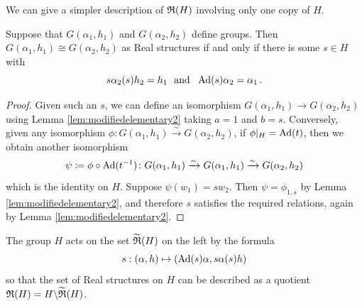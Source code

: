 We can give a simpler description of ${\mathfrak R}(H)$ involving only one copy of $H$.

\begin{lemma}\label{lem:elementary3}
  Suppose that $G(\alpha_1, h_1)$ and $G(\alpha_2, h_2)$ define groups. Then $G(\alpha_1, h_1) \cong G(\alpha_2, h_2)$ as Real structures if and only if there is some $s \in H$ with
  \begin{equation}\label{copyH2action2}
  s  \alpha_2(s) h_2  = h_1
  \ \mbox{ and } \ 
    \Ad(s) \alpha_2 = \alpha_1 \, .
\end{equation} 
\end{lemma}
\begin{proof}
  Given such an $s$, we can define an isomorphism $G(\alpha_1, h_1) \rightarrow G(\alpha_2, h_2)$ using Lemma \ref{lem:modifiedelementary2} taking $a = 1$ and $b = s$. Conversely, given any isomorphism $\phi \colon G(\alpha_1, h_1) \xrightarrow{\sim} G(\alpha_2, h_2)$, if $\phi|_H = \operatorname{Ad}(t)$, then we obtain another isomorphism
  \[
  \psi \coloneqq \phi \circ \operatorname{Ad}(t^{-1}) \colon G(\alpha_1, h_1) \xrightarrow{\sim} G(\alpha_1, h_1) \xrightarrow{\sim} G(\alpha_2, h_2)
  \]
  which is the identity on $H$.
  Suppose $\psi(w_1) = s w_2$.  Then $\psi = \phi_{1,s}$ by Lemma \ref{lem:modifiedelementary2}, and therefore $s$ satisfies the required relations, again by Lemma \ref{lem:modifiedelementary2}.
\end{proof}

\begin{thm}\label{cor:Haction}
The group $H$ acts on the set $\widetilde{{\mathfrak R}}(H)$ on the left by the formula 
  \begin{equation}\label{Haction_explicit}
     s : (\alpha , h ) \mapsto
    (\operatorname{Ad}(s) \alpha,  s  \alpha(s) h) 
  \end{equation}
  so that the set of Real structures on $H$ can be described as a quotient
  ${\mathfrak R}(H) = H \backslash \widetilde{{\mathfrak R}}(H)$. 
\end{thm}

